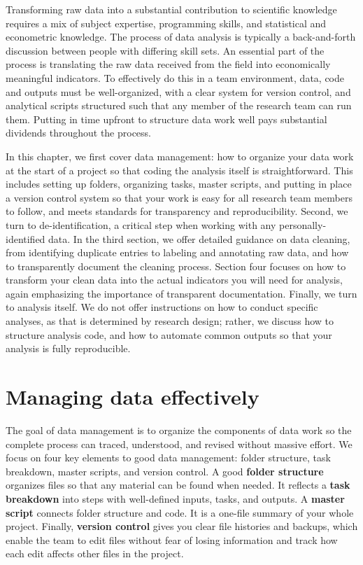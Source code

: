 
\begin{fullwidth}
Transforming raw data into a substantial contribution to scientific knowledge
requires a mix of subject expertise, programming skills,
and statistical and econometric knowledge.
The process of data analysis is typically
a back-and-forth discussion between people
with differing skill sets.
An essential part of the process is translating the
raw data received from the field into economically meaningful indicators.
To effectively do this in a team environment,
data, code and outputs must be well-organized,
with a clear system for version control,
and analytical scripts structured such that any member of the research team can run them.
Putting in time upfront to structure data work well
pays substantial dividends throughout the process.

In this chapter, we first cover data management:
how to organize your data work at the start of a project
so that coding the analysis itself is straightforward.
This includes setting up folders, organizing tasks, master scripts,
and putting in place a version control system
so that your work is easy for all research team members to follow,
and meets standards for transparency and reproducibility.
Second, we turn to de-identification,
a critical step when working with any personally-identified data.
In the third section, we offer detailed guidance on data cleaning,
from identifying duplicate entries to labeling and annotating raw data,
and how to transparently document the cleaning process.
Section four focuses on how to transform your clean data
into the actual indicators you will need for analysis,
again emphasizing the importance of transparent documentation.
Finally, we turn to analysis itself.
We do not offer instructions on how to conduct specific analyses,
as that is determined by research design;
rather, we discuss how to structure analysis code,
and how to automate common outputs so that your analysis is fully reproducible.

\end{fullwidth}


\section{Managing data effectively}

The goal of data management is to organize the components of data work
so the complete process can traced, understood, and revised without massive effort.
We focus on four key elements to good data management:
folder structure, task breakdown, master scripts, and version control.
A good \textbf{folder structure} organizes files so that any material can be found when needed.
It reflects a \textbf{task breakdown} into steps with well-defined inputs, tasks, and outputs.
A \textbf{master script} connects folder structure and code.
It is a one-file summary of your whole project.
Finally, \textbf{version control} gives you clear file histories and backups,
which enable the team to edit files without fear of losing information
and track how each edit affects other files in the project.

